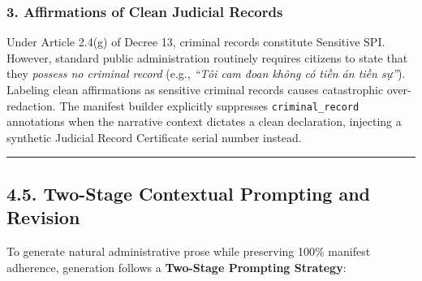 \documentclass[
]{article}
\begin{document}
\subsubsection{3. Affirmations of Clean Judicial
Records}\label{affirmations-of-clean-judicial-records}

Under Article 2.4(g) of Decree 13, criminal records constitute Sensitive
SPI. However, standard public administration routinely requires citizens
to state that they \emph{possess no criminal record} (e.g., \emph{``Tôi
cam đoan không có tiền án tiền sự''}). Labeling clean affirmations as
sensitive criminal records causes catastrophic over-redaction. The
manifest builder explicitly suppresses \texttt{criminal\_record}
annotations when the narrative context dictates a clean declaration,
injecting a synthetic Judicial Record Certificate serial number instead.

\begin{center}\rule{0.5\linewidth}{0.5pt}\end{center}

\subsection{4.5. Two-Stage Contextual Prompting and
Revision}\label{two-stage-contextual-prompting-and-revision}

To generate natural administrative prose while preserving 100\% manifest
adherence, generation follows a \textbf{Two-Stage Prompting Strategy}:
\end{document}
